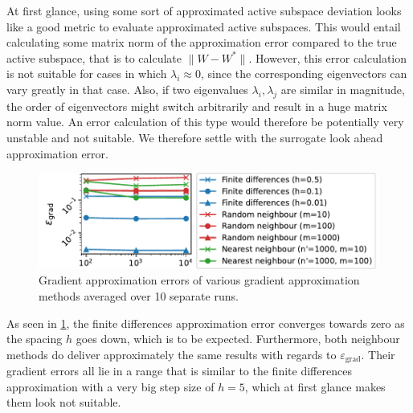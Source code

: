 \documentclass[
  a4paper,  %
  twoside,  %
  bibliography=totoc,
  headsepline,
  cleardoublepage=empty,
  parskip=half,
  draft=false
]{scrbook}
\begin{document}
At first glance, using some sort of approximated active subspace deviation looks like a good metric to evaluate approximated active subspaces.
This would entail calculating some matrix norm of the approximation error compared to the true active subspace, that is to calculate $\| W - W^\ast \|$.
However, this error calculation is not suitable for cases in which $\lambda_i \approx 0$, since the corresponding eigenvectors can vary greatly in that case.
Also, if two eigenvalues $\lambda_i, \lambda_j$ are similar in magnitude, the order of eigenvectors might switch arbitrarily and result in a huge matrix norm value.
An error calculation of this type would therefore be potentially very unstable and not suitable.
We therefore settle with the surrogate look ahead approximation error.

\begin{mdframed}[style=style]
\begin{figure}[H]
	\includegraphics[width=\textwidth]{graphics/ww_as_grad_errors}
\delimit
	\caption{Gradient approximation errors of various gradient approximation methods averaged over 10 separate runs.}
	\label{fig:ishigami_as_grad}
\end{figure}
\end{mdframed}
%
As seen in \cref{fig:ishigami_as_grad}, the finite differences approximation error converges towards zero as the spacing $h$ goes down, which is to be expected.
Furthermore, both neighbour methods do deliver approximately the same results with regards to $\varepsilon_{\mathrm{grad}}$.
Their gradient errors all lie in a range that is similar to the finite differences approximation with a very big step size of $h=5$, which at first glance makes them look not suitable.
\end{document}

